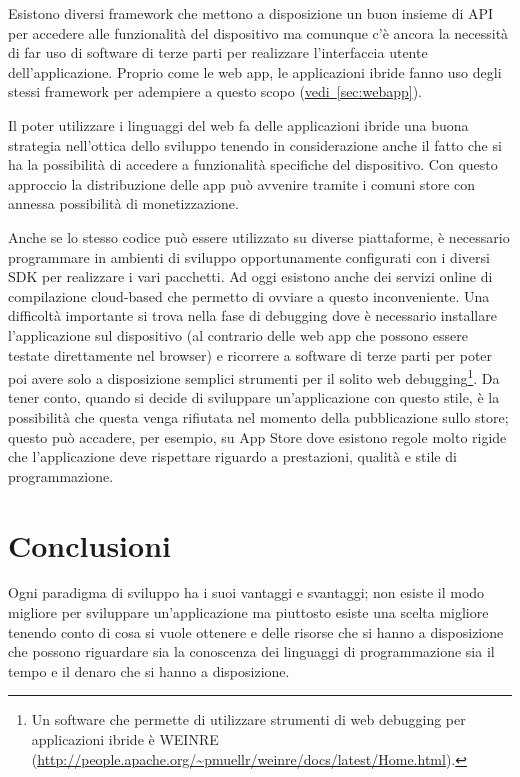 		Esistono diversi framework che mettono a disposizione un buon insieme di 
		API per accedere alle funzionalità del dispositivo ma comunque c'è 
		ancora la necessità di far uso di software di terze parti per realizzare 
		l'interfaccia utente dell'applicazione. Proprio come le web app, le 
		applicazioni ibride fanno uso degli stessi framework per adempiere a 
		questo scopo (\hyperref[sec:webapp]{vedi~\ref{sec:webapp}}).
		
		Il poter utilizzare i linguaggi del web fa delle applicazioni ibride una 
		buona strategia nell'ottica dello sviluppo \crossplat tenendo in 
		considerazione anche il fatto che si ha la possibilità di accedere a 
		funzionalità specifiche del dispositivo. Con questo approccio la 
		distribuzione delle app può avvenire tramite i comuni store con 
		annessa possibilità di monetizzazione.
		
		Anche se lo stesso codice può essere utilizzato su diverse piattaforme, 
		è necessario programmare in ambienti di sviluppo opportunamente 
		configurati con i diversi SDK per realizzare i vari pacchetti. Ad oggi 
		esistono anche dei servizi online di compilazione cloud-based che 
		permetto di ovviare a questo inconveniente. Una difficoltà importante si 
		trova nella fase di debugging dove è necessario installare 
		l'applicazione sul dispositivo (al contrario delle web app che possono 
		essere testate direttamente nel browser) e ricorrere a software di terze 
		parti per poter poi avere solo a disposizione semplici strumenti per il 
		solito web debugging\footnote{Un software che permette di utilizzare 
		strumenti di web debugging per applicazioni ibride è WEINRE 
		(\url{http://people.apache.org/~pmuellr/weinre/docs/latest/Home.html}). 
		}. Da tener conto, quando si decide di sviluppare un'applicazione con 
		questo stile, è la possibilità che questa venga rifiutata nel momento 
		della pubblicazione sullo store; questo può accadere, per esempio, su 
		App Store dove esistono regole molto rigide che l'applicazione deve 
		rispettare riguardo a prestazioni, qualità e stile di programmazione.
		
	\section{Conclusioni}
		Ogni paradigma di sviluppo ha i suoi vantaggi e svantaggi; non esiste il 
		modo migliore per sviluppare un'applicazione ma piuttosto esiste una 
		scelta migliore tenendo conto di cosa si vuole ottenere e delle risorse 
		che si hanno a disposizione che possono riguardare sia la conoscenza dei
		linguaggi di programmazione sia il tempo e il denaro che si hanno a
		disposizione.
		
